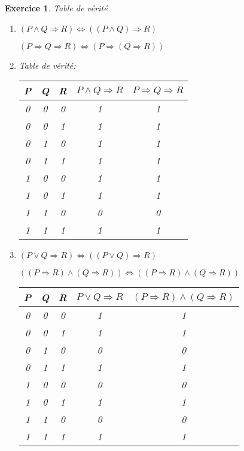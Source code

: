 \documentclass{article}
\theoremstyle{plain}
\newtheorem{exo}{Exercice}%
\begin{document}
\begin{exo} Table de vérité
\begin{enumerate}
    \item $(P \wedge Q \Rightarrow R) \Leftrightarrow ((P \wedge Q) \Rightarrow R)$

    $(P \Rightarrow Q \Rightarrow R) \Leftrightarrow (P \Rightarrow (Q \Rightarrow R))$

    \item Table de vérité: \vspace{3mm} \\
    \begin{tabular} {c|c|c|c|c}
        P & Q & R & $P \wedge Q \Rightarrow R$ & $P \Rightarrow Q \Rightarrow R$\\
        \hline
        0 & 0 & 0 & 1 & 1 \\
        0 & 0 & 1 & 1 & 1 \\
        0 & 1 & 0 & 1 & 1 \\
        0 & 1 & 1 & 1 & 1 \\
        1 & 0 & 0 & 1 & 1 \\
        1 & 0 & 1 & 1 & 1 \\
        1 & 1 & 0 & 0 & 0 \\
        1 & 1 & 1 & 1 & 1 
    \end{tabular}

    \item $(P \vee Q \Rightarrow R) \Leftrightarrow ((P \vee Q) \Rightarrow R)$
    
    $((P \Rightarrow R) \wedge (Q \Rightarrow R)) \Leftrightarrow ((P \Rightarrow R) \wedge (Q \Rightarrow R))$

    \begin{tabular} {c|c|c|c|c}
        P & Q & R & $P \vee Q \Rightarrow R$ & $(P \Rightarrow R) \wedge (Q \Rightarrow R)$\\
        \hline
        0 & 0 & 0 & 1 & 1 \\
        0 & 0 & 1 & 1 & 1 \\
        0 & 1 & 0 & 0 & 0 \\
        0 & 1 & 1 & 1 & 1 \\
        1 & 0 & 0 & 0 & 0 \\
        1 & 0 & 1 & 1 & 1 \\
        1 & 1 & 0 & 0 & 0 \\
        1 & 1 & 1 & 1 & 1 
    \end{tabular}
\end{enumerate}
\end{exo}
\end{document}
